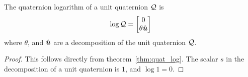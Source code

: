 \begin{corollary}\label{thm:quat_unit_log}
The quaternion logarithm of a unit quaternion $\mathcal{Q}$ is
\begin{equation}
  \log \quat Q = \quatsv{0}{\theta \vhat u} \label{eqn:quat_unit_log_def}
\end{equation}
where $\theta$, and $\hat{\boldsymbol{u}}$ are a decomposition of the unit quaternion $\mathcal{Q}$.
\end{corollary}
\begin{proof}
This follows directly from theorem~\ref{thm:quat_log}. The scalar $s$ in the
decomposition of a unit quaternion is $1$, and $\log 1=0$.
\end{proof}
 
